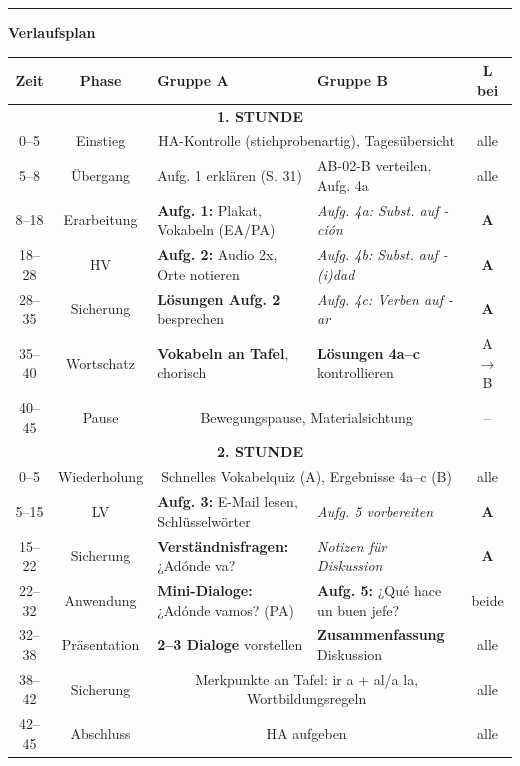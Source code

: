 \documentclass[11pt, a4paper]{article}
\begin{document}
\vspace{0.3cm}
\hrule
\vspace{0.3cm}


\textbf{\large Verlaufsplan}

\vspace{0.2cm}

\footnotesize
\begin{tabularx}{\textwidth}{|c|c|X|X|c|}
\hline
\rowcolor{spanisch!20}
\textbf{Zeit} & \textbf{Phase} & \textbf{Gruppe A} & \textbf{Gruppe B} & \textbf{L bei} \\
\hline
\multicolumn{5}{|c|}{\cellcolor{hellgrau}\textbf{1. STUNDE}} \\
\hline
0--5 & Einstieg & \multicolumn{2}{c|}{HA-Kontrolle (stichprobenartig), Tagesübersicht} & alle \\
\hline
5--8 & Übergang & Aufg. 1 erklären (S. 31) & AB-02-B verteilen, Aufg. 4a & alle \\
\hline
8--18 & Erarbeitung & \textbf{Aufg. 1:} Plakat, Vokabeln (EA/PA) & \textit{Aufg. 4a: Subst. auf -ción} & \textcolor{gruppeA}{\textbf{A}} \\
\hline
18--28 & HV & \textbf{Aufg. 2:} Audio 2x, Orte notieren & \textit{Aufg. 4b: Subst. auf -(i)dad} & \textcolor{gruppeA}{\textbf{A}} \\
\hline
28--35 & Sicherung & \textbf{Lösungen Aufg. 2} besprechen & \textit{Aufg. 4c: Verben auf -ar} & \textcolor{gruppeA}{\textbf{A}} \\
\hline
35--40 & Wortschatz & \textbf{Vokabeln an Tafel}, chorisch & \textbf{Lösungen 4a--c} kontrollieren & A $\rightarrow$ B \\
\hline
40--45 & Pause & \multicolumn{2}{c|}{Bewegungspause, Materialsichtung} & -- \\
\hline
\multicolumn{5}{|c|}{\cellcolor{hellgrau}\textbf{2. STUNDE}} \\
\hline
0--5 & Wiederholung & \multicolumn{2}{c|}{Schnelles Vokabelquiz (A), Ergebnisse 4a--c (B)} & alle \\
\hline
5--15 & LV & \textbf{Aufg. 3:} E-Mail lesen, Schlüsselwörter & \textit{Aufg. 5 vorbereiten} & \textcolor{gruppeA}{\textbf{A}} \\
\hline
15--22 & Sicherung & \textbf{Verständnisfragen:} ¿Adónde va? & \textit{Notizen für Diskussion} & \textcolor{gruppeA}{\textbf{A}} \\
\hline
22--32 & Anwendung & \textbf{Mini-Dialoge:} ¿Adónde vamos? (PA) & \textbf{Aufg. 5:} ¿Qué hace un buen jefe? & beide \\
\hline
32--38 & Präsentation & \textbf{2--3 Dialoge} vorstellen & \textbf{Zusammenfassung} Diskussion & alle \\
\hline
38--42 & Sicherung & \multicolumn{2}{c|}{Merkpunkte an Tafel: ir a + al/a la, Wortbildungsregeln} & alle \\
\hline
42--45 & Abschluss & \multicolumn{2}{c|}{HA aufgeben} & alle \\
\hline
\end{tabularx}
\end{document}
